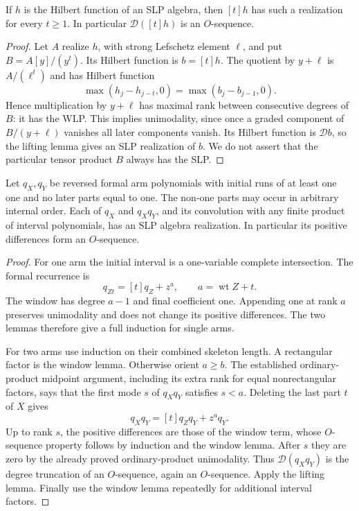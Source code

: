 \begin{lemma}
If $h$ is the Hilbert function of an SLP algebra, then
$[t]h$ has such a realization for every $t\ge1$.
In particular $\mathcal D([t]h)$ is an $O$-sequence.
\end{lemma}
\begin{proof}
Let $A$ realize $h$, with strong Lefschetz element $\ell$, and
put $B=A[y]/(y^t)$. Its Hilbert function is $b=[t]h$.
The quotient by $y+\ell$ is $A/(\ell^t)$ and has Hilbert
function
\[
                    \max(h_j-h_{j-t},0)
                         =\max(b_j-b_{j-1},0).
\]
Hence multiplication by $y+\ell$ has maximal rank between
consecutive degrees of $B$: it has the WLP. This implies
unimodality, since once a graded component of $B/(y+\ell)$
vanishes all later components vanish. Its Hilbert function
is $\mathcal D b$, so the lifting lemma gives an SLP
realization of $b$. We do not assert that the particular
tensor product $B$ always has the SLP.
\end{proof}

\begin{theorem}
Let $q_X,q_Y$ be reversed formal arm polynomials with initial
runs of at least one one and no later parts equal to one.
The non-one parts may occur in arbitrary internal order.
Each of $q_X$ and $q_Xq_Y$, and its convolution with any
finite product of interval polynomials, has an SLP algebra
realization. In particular its positive differences form an
$O$-sequence.
\end{theorem}
\begin{proof}
For one arm the initial interval is a one-variable complete
intersection. The formal recurrence is
\[
                   q_{Zt}=[t]q_Z+z^{a},\qquad a=\operatorname{wt}Z+t.
\]
The window has degree $a-1$ and final coefficient one.
Appending one at rank $a$ preserves unimodality and does not
change its positive differences. The two lemmas therefore
give a full induction for single arms.

For two arms use induction on their combined skeleton length.
A rectangular factor is the window lemma. Otherwise orient
$a\ge b$. The established ordinary-product midpoint argument,
including its extra rank for equal nonrectangular factors,
says that the first mode $s$ of $q_Xq_Y$ satisfies $s<a$.
Deleting the last part $t$ of $X$ gives
\[
                        q_Xq_Y=[t]q_Zq_Y+z^a q_Y.
\]
Up to rank $s$, the positive differences are those of the
window term, whose $O$-sequence property follows by induction
and the window lemma. After $s$ they are zero by the already
proved ordinary-product unimodality. Thus $\mathcal D(q_Xq_Y)$
is the degree truncation of an $O$-sequence, again an
$O$-sequence. Apply the lifting lemma. Finally use the
window lemma repeatedly for additional interval factors.
\end{proof}

